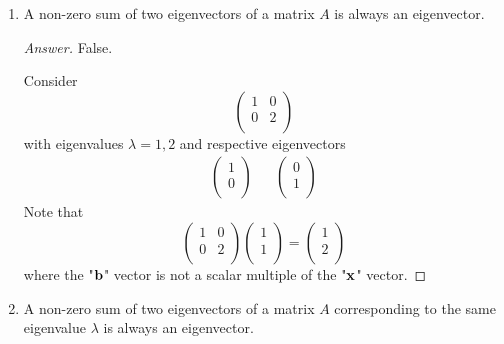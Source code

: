\documentclass[../psets.tex]{subfiles}
\begin{document}
\begin{enumerate}[label={\textbf{1.\arabic*.}}]
\begin{enumerate}
        \item A non-zero sum of two eigenvectors of a matrix $A$ is always an eigenvector.
        \begin{proof}[Answer]
            False.\par
            Consider
            \begin{equation*}
                \begin{pmatrix}
                    1 & 0\\
                    0 & 2\\
                \end{pmatrix}
            \end{equation*}
            with eigenvalues $\lambda=1,2$ and respective eigenvectors
            \begin{align*}
                \begin{pmatrix}
                    1\\
                    0\\
                \end{pmatrix}&&
                \begin{pmatrix}
                    0\\
                    1\\
                \end{pmatrix}
            \end{align*}
            Note that
            \begin{equation*}
                \begin{pmatrix}
                    1 & 0\\
                    0 & 2\\
                \end{pmatrix}
                \begin{pmatrix}
                    1\\
                    1\\
                \end{pmatrix}
                =
                \begin{pmatrix}
                    1\\
                    2\\
                \end{pmatrix}
            \end{equation*}
            where the "$\mathbf{b}$" vector is not a scalar multiple of the "$\mathbf{x}$" vector.
        \end{proof}
        \item A non-zero sum of two eigenvectors of a matrix $A$ corresponding to the same eigenvalue $\lambda$ is always an eigenvector.

\end{enumerate}
\end{enumerate}
\end{document}
